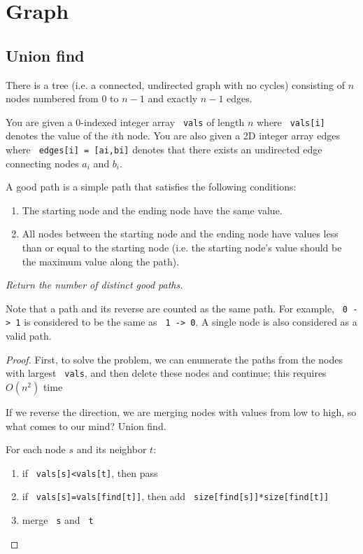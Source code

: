 \documentclass[11pt]{article}
\let\OldTexttt\texttt
\renewcommand{\texttt}[1]{\OldTexttt{\color{MidnightBlue} #1}}
\begin{document}
\section{Graph}
\label{sec:org51d0080}
\subsection{Union find}
\label{sec:orgbe9d772}
\begin{problem}
There is a tree (i.e. a connected, undirected graph with no cycles) consisting of \(n\) nodes
numbered from 0 to \(n-1\) and exactly \(n - 1\) edges.

You are given a 0-indexed integer array \texttt{vals} of length \(n\) where \texttt{vals[i]} denotes the value of the
\(i\)th node. You are also given a 2D integer array edges where \texttt{edges[i] = [ai,bi]} denotes that
there exists an undirected edge connecting nodes \(a_i\) and \(b_i\).

A good path is a simple path that satisfies the following conditions:
\begin{enumerate}
\item The starting node and the ending node have the same value.
\item All nodes between the starting node and the ending node have values less than or equal to the
starting node (i.e. the starting node's value should be the maximum value along the path).
\end{enumerate}

\emph{Return the number of distinct good paths.}

Note that a path and its reverse are counted as the same path. For example, \texttt{0 -> 1} is considered
to be the same as \texttt{1 -> 0}. A single node is also considered as a valid path.
\end{problem}

\begin{proof}
First, to solve the problem, we can enumerate the paths from the nodes with largest \texttt{vals}, and
then delete these nodes and continue; this requires \(O(n^2)\) time

If we reverse the direction, we are merging nodes with values from low to high, so what comes to
our mind? Union find.

For each node \(s\) and its neighbor \(t\):
\begin{enumerate}
\item if \texttt{vals[s]<vals[t]}, then pass
\item if \texttt{vals[s]=vals[find[t]]}, then add \texttt{size[find[s]]*size[find[t]]}
\item merge \texttt{s} and \texttt{t}
\end{enumerate}
\end{proof}
\end{document}
